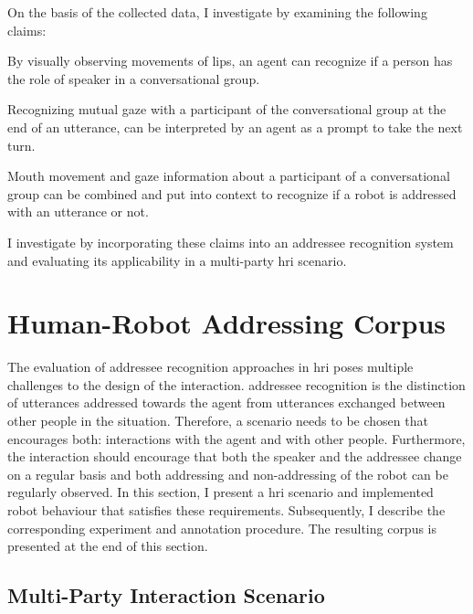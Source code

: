 On the basis of the collected data, I investigate  by examining the following claims: 
\newcommand{\hypmekahone}{By visually observing movements of lips, an agent can recognize if a person has the role of \gls{speaker} in a \gls{conversational group}.}
\begin{hyp3}
    \label{meka.h1}
    \hypmekahone
\end{hyp3}
\newcommand{\hypmekahtwo}{Recognizing mutual gaze with a participant of the \gls{conversational group} at the end of an utterance, can be interpreted by an agent as a prompt to take the next \gls{turn}.}
\begin{hyp3}
    \label{meka.h2}
    \hypmekahtwo
\end{hyp3}
\newcommand{\hypmekahthree}{Mouth movement and gaze information about a participant of a \gls{conversational group} can be combined and put into context to recognize if a \gls{robot} is addressed with an utterance or not.}
\begin{hyp3}
    \label{meka.h3}
    \hypmekahthree
\end{hyp3}
I investigate  by incorporating these claims into an \gls{addressee} recognition system and evaluating its applicability in a multi-party \gls{hri} scenario.

\section{Human-Robot Addressing Corpus}\label{sec.meka.corpus}

The evaluation of \gls{addressee} recognition approaches in \gls{hri} poses multiple challenges to the design of the interaction.
\Gls{addressee} recognition is the distinction of utterances addressed towards the agent from utterances exchanged between other people in the situation.
Therefore, a scenario needs to be chosen that encourages both: interactions with the agent and with other people.
Furthermore, the interaction should encourage that both the speaker and the \gls{addressee} change on a regular basis and both addressing and non-addressing of the \gls{robot} can be regularly observed.
In this section, I present a \gls{hri} scenario and implemented \gls{robot} behaviour that satisfies these requirements.
Subsequently, I describe the corresponding experiment and annotation procedure.
The resulting corpus is presented at the end of this section.

\subsection{Multi-Party Interaction Scenario}\label{sec:meka-scenario}


